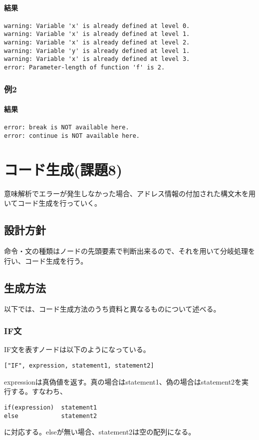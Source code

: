 \documentclass[titlepage, a4paper,12pt]{jarticle}
\begin{document}
\paragraph{結果}
\begin{verbatim}
warning: Variable 'x' is already defined at level 0.
warning: Variable 'x' is already defined at level 1.
warning: Variable 'x' is already defined at level 2.
warning: Variable 'y' is already defined at level 1.
warning: Variable 'x' is already defined at level 3.
error: Parameter-length of function 'f' is 2.
\end{verbatim}
\subsubsection{例2}

\paragraph{結果}
\begin{verbatim}
error: break is NOT available here.
error: continue is NOT available here.
\end{verbatim}
\section{コード生成(課題8)}
\label{sec:code}
意味解析でエラーが発生しなかった場合、アドレス情報の付加された構文木を用いてコード生成を行っていく。
\subsection{設計方針}
命令・文の種類はノードの先頭要素で判断出来るので、それを用いて分岐処理を行い、コード生成を行う。
\subsection{生成方法}
以下では、コード生成方法のうち資料と異なるものについて述べる。
\subsubsection{IF文}
IF文を表すノードは以下のようになっている。
\begin{verbatim}
["IF", expression, statement1, statement2]
\end{verbatim}
expressionは真偽値を返す。真の場合はstatement1、偽の場合はstatement2を実行する。すなわち、
\begin{verbatim}
if(expression)  statement1
else            statement2
\end{verbatim}
に対応する。elseが無い場合、statement2は空の配列になる。
\end{document}
